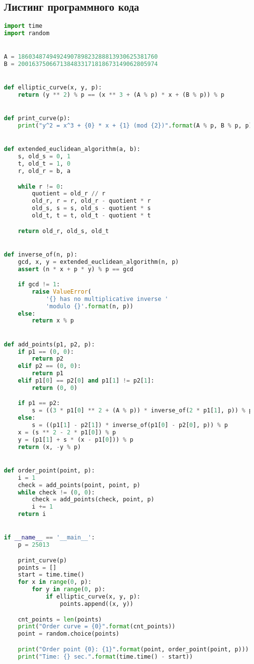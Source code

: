 \documentclass[12pt]{article}
\begin{document}
\subsection*{Листинг программного кода}
\begin{lstlisting}[language=Python]
import time
import random


A = 1860348749492490789823288813930625381760
B = 2001637506671384833171818673149062805974


def elliptic_curve(x, y, p):
    return (y ** 2) % p == (x ** 3 + (A % p) * x + (B % p)) % p


def print_curve(p):
    print("y^2 = x^3 + {0} * x + {1} (mod {2})".format(A % p, B % p, p))


def extended_euclidean_algorithm(a, b):
    s, old_s = 0, 1
    t, old_t = 1, 0
    r, old_r = b, a

    while r != 0:
        quotient = old_r // r
        old_r, r = r, old_r - quotient * r
        old_s, s = s, old_s - quotient * s
        old_t, t = t, old_t - quotient * t

    return old_r, old_s, old_t


def inverse_of(n, p):
    gcd, x, y = extended_euclidean_algorithm(n, p)
    assert (n * x + p * y) % p == gcd

    if gcd != 1:
        raise ValueError(
            '{} has no multiplicative inverse '
            'modulo {}'.format(n, p))
    else:
        return x % p


def add_points(p1, p2, p):
    if p1 == (0, 0):
        return p2
    elif p2 == (0, 0):
        return p1
    elif p1[0] == p2[0] and p1[1] != p2[1]:
        return (0, 0)

    if p1 == p2:
        s = ((3 * p1[0] ** 2 + (A % p)) * inverse_of(2 * p1[1], p)) % p
    else:
        s = ((p1[1] - p2[1]) * inverse_of(p1[0] - p2[0], p)) % p
    x = (s ** 2 - 2 * p1[0]) % p
    y = (p1[1] + s * (x - p1[0])) % p
    return (x, -y % p)


def order_point(point, p):
    i = 1
    check = add_points(point, point, p)
    while check != (0, 0):
        check = add_points(check, point, p)
        i += 1
    return i


if __name__ == '__main__':
    p = 25013

    print_curve(p)
    points = []
    start = time.time()
    for x in range(0, p):
        for y in range(0, p):
            if elliptic_curve(x, y, p):
                points.append((x, y))

    cnt_points = len(points)
    print("Order curve = {0}".format(cnt_points))
    point = random.choice(points)

    print("Order point {0}: {1}".format(point, order_point(point, p)))
    print("Time: {} sec.".format(time.time() - start))

\end{lstlisting}
\end{document}
